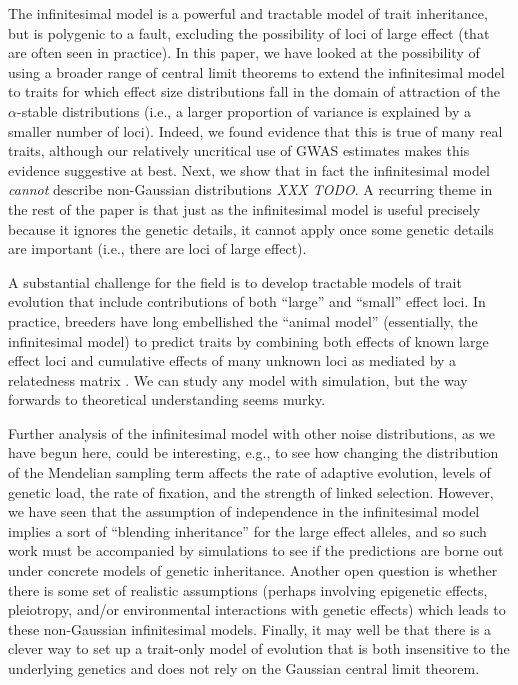 \documentclass{article}
\newcommand{\1}{\mathbbm{1}}
\newcommand{\comment}[1]{{\color{blue} \it #1}}
\theoremstyle{remark}
\theoremstyle{definition}
\begin{document}
The infinitesimal model is a powerful and tractable model of trait inheritance,
but is polygenic to a fault,
excluding the possibility of loci of large effect
(that are often seen in practice).
In this paper,
we have looked at the possibility of using a broader range of central limit theorems
to extend the infinitesimal model to traits for which 
effect size distributions fall in the domain of attraction of the $\alpha$-stable distributions
(i.e., a larger proportion of variance
is explained by a smaller number of loci).
Indeed, we found evidence that this is true of many real traits,
although our relatively uncritical use of GWAS estimates makes this evidence suggestive at best.
Next, we show that in fact the infinitesimal model \emph{cannot} describe non-Gaussian distributions
\comment{XXX TODO}.
A recurring theme in the rest of the paper is
that just as the infinitesimal model is useful precisely because it ignores the genetic details,
it cannot apply once some genetic details are important
(i.e., there are loci of large effect).



A substantial challenge for the field is to develop tractable models of trait evolution
that include contributions of both ``large'' and ``small'' effect loci.
In practice, breeders have long embellished the ``animal model'' (essentially, the infinitesimal model)
to predict traits
by combining both effects of known large effect loci
and cumulative effects of many unknown loci as mediated by a relatedness matrix
\citep[e.g.,][]{fernando1989marker,teissier2018weighted,bernardo2014genomewide,rice2019evaluation}.
We can study any model with simulation,
but the way forwards to theoretical understanding seems murky.

Further analysis of the infinitesimal model with other noise distributions,
as we have begun here,
could be interesting,
e.g., to see how changing the distribution of the Mendelian sampling term
affects the rate of adaptive evolution,
levels of genetic load,
the rate of fixation,
and the strength of linked selection.
However,
we have seen that the assumption of independence in the infinitesimal model
implies a sort of ``blending inheritance''
for the large effect alleles,
and so such work must be accompanied by simulations
to see if the predictions are borne out under concrete models of genetic inheritance.
Another open question is whether there is some set of realistic assumptions
(perhaps involving epigenetic effects, pleiotropy, and/or environmental interactions with genetic effects)
which leads to these non-Gaussian infinitesimal models.
Finally, it may well be that there is a clever way to set up a trait-only model of evolution
that is both insensitive to the underlying genetics
and does not rely on the Gaussian central limit theorem.
\end{document}

